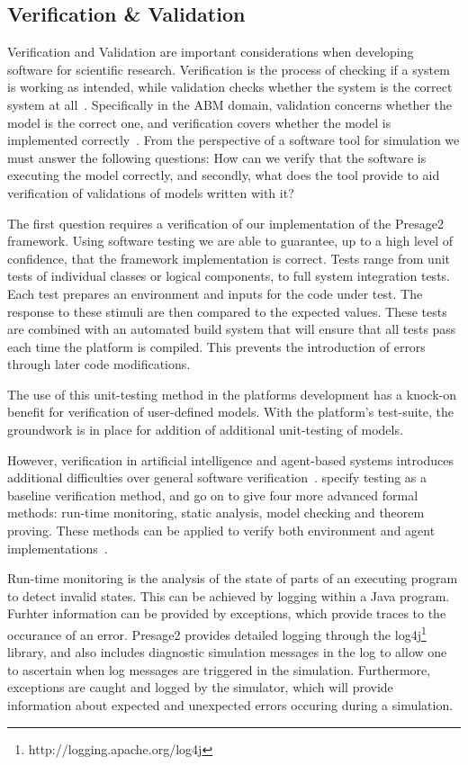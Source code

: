 \subsection{Verification \& Validation}

Verification and Validation are important considerations when developing
software for scientific research. Verification is the process of checking if a
system is working as intended, while validation checks whether the system is
the correct system at all~\citep{Wallace1989}. Specifically in the \ac{ABM}
domain, validation concerns whether the model is the correct one, and
verification covers whether the model is implemented
correctly~\citep{Ormerod2009}. From the perspective of a software tool for
simulation we must answer the following questions: How can we verify that the
software is executing the model correctly, and secondly, what does the tool
provide to aid verification of validations of models written with it?

The first question requires a verification of our implementation of the Presage2
framework. Using software testing we are able to guarantee, up to a high level of
confidence, that the framework implementation is correct. Tests range from unit
tests of individual classes or logical components, to full system integration
tests. Each test prepares an environment and inputs for the code under test. The
response to these stimuli are then compared to the expected values. These tests
are combined with an automated build system that will ensure that all tests pass
each time the platform is compiled. This prevents the introduction of errors
through later code modifications.

The use of this unit-testing method in the platforms development has a knock-on
benefit for verification of user-defined models. With the platform's test-suite,
the groundwork is in place for addition of additional unit-testing of models.

However, verification in artificial intelligence and agent-based systems
introduces additional difficulties over general software
verification~\citep{Wooldridge1998}. \citet{Menzies2005} specify testing as a
baseline verification method, and go on to give four more advanced formal
methods: run-time monitoring, static analysis, model checking and theorem
proving. These methods can be applied to verify both environment and agent
implementations~\citep{Sudeikat2007a}.

Run-time monitoring is the analysis of the state of parts of an executing
program to detect invalid states. This can be achieved by logging within a
Java program. Furhter information can be provided by exceptions, which provide
traces to the occurance of an error. Presage2 provides detailed logging through
the log4j\footnote{http://logging.apache.org/log4j} library, and also includes diagnostic simulation messages in the log
to allow one to ascertain when log messages are triggered in the simulation.
Furthermore, exceptions are caught and logged by the simulator, which will
provide information about expected and unexpected errors occuring during a
simulation.

